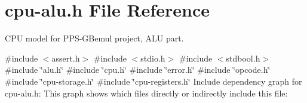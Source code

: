 \hypertarget{cpu-alu_8h}{}\section{cpu-\/alu.h File Reference}
\label{cpu-alu_8h}


C\+PU model for P\+P\+S-\/\+G\+Bemul project, A\+LU part.  


{\ttfamily \#include $<$assert.\+h$>$}\newline
{\ttfamily \#include $<$stdio.\+h$>$}\newline
{\ttfamily \#include $<$stdbool.\+h$>$}\newline
{\ttfamily \#include \char`\"{}alu.\+h\char`\"{}}\newline
{\ttfamily \#include \char`\"{}cpu.\+h\char`\"{}}\newline
{\ttfamily \#include \char`\"{}error.\+h\char`\"{}}\newline
{\ttfamily \#include \char`\"{}opcode.\+h\char`\"{}}\newline
{\ttfamily \#include \char`\"{}cpu-\/storage.\+h\char`\"{}}\newline
{\ttfamily \#include \char`\"{}cpu-\/registers.\+h\char`\"{}}\newline
Include dependency graph for cpu-\/alu.h\+:
This graph shows which files directly or indirectly include this file\+:
